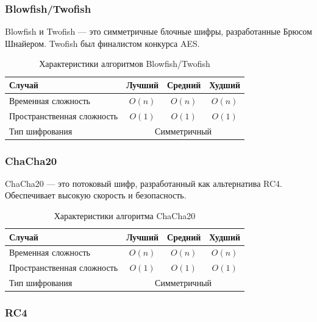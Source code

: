 \documentclass[a4paper,12pt]{article}
\begin{document}
\subsubsection{Blowfish/Twofish}
\label{subsubsec:blowfish-twofish}

Blowfish и Twofish --- это симметричные блочные шифры, разработанные Брюсом Шнайером. Twofish был финалистом конкурса AES.

\begin{table}[H]
    \centering
    \begin{tabular}{|l|c|c|c|}
        \hline
        Случай & Лучший & Средний & Худший \\
        \hline
        Временная сложность & $O(n)$ & $O(n)$ & $O(n)$ \\
        \hline
        Пространственная сложность & $O(1)$ & $O(1)$ & $O(1)$ \\
        \hline
        Тип шифрования & \multicolumn{3}{c|}{Симметричный} \\
        \hline
    \end{tabular}
    \caption{Характеристики алгоритмов Blowfish/Twofish}
\end{table}

\subsubsection{ChaCha20}
\label{subsubsec:chacha20}

ChaCha20 --- это потоковый шифр, разработанный как альтернатива RC4. Обеспечивает высокую скорость и безопасность.

\begin{table}[H]
    \centering
    \begin{tabular}{|l|c|c|c|}
        \hline
        Случай & Лучший & Средний & Худший \\
        \hline
        Временная сложность & $O(n)$ & $O(n)$ & $O(n)$ \\
        \hline
        Пространственная сложность & $O(1)$ & $O(1)$ & $O(1)$ \\
        \hline
        Тип шифрования & \multicolumn{3}{c|}{Симметричный} \\
        \hline
    \end{tabular}
    \caption{Характеристики алгоритма ChaCha20}
\end{table}

\subsubsection{RC4}
\label{subsubsec:rc4}
\end{document}
